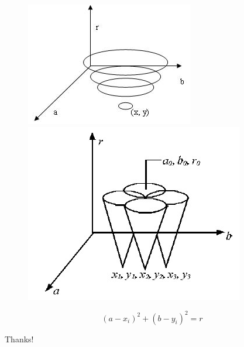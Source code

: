 \documentclass[notheorems,serif,table,compress]{beamer}  %
\begin{document}
\begin{frame}
    \begin{figure}
        \begin{minipage}[t]{0.4\linewidth}
            \includegraphics[width=1.1\linewidth]{yuan1.png} 
        \end{minipage}
        \quad
        \begin{minipage}[t]{0.4\linewidth}
            \includegraphics[width=1\linewidth]{yuan2.png} 
        \end{minipage}
    \end{figure}
    \begin{displaymath}
        (a-x_{i})^{2}+(b-y_{i})^{2}=r
    \end{displaymath}
\end{frame}

\begin{frame}
  \vspace{2cm}
  \centering
  \color{blue}\Huge{Thanks!}
  \vspace{1.5cm}
 

\end{frame}
\end{document}
